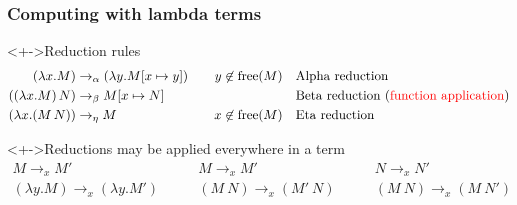\documentclass[pdftex,aspectratio=169]{beamer}
\begin{document}
\begin{frame}[fragile]
  \frametitle{Computing with lambda terms}
  \begin{block}<+->{Reduction rules}\VSPBLS
    \begin{alignat*}{2}
      (\lambda x.M) & \rightarrow_{\alpha} (\lambda y.M[x\mapsto y]) \quad 
      & y\not\in\operatorname{free}(M) & \quad\text{Alpha reduction}
      \\
      ((\lambda x.M)\,N) & \rightarrow_{\beta} M[x\mapsto N]
      && \quad\text{Beta reduction (\textcolor{red}{function application})}
      \\
      (\lambda x.(M\,N)) & \rightarrow_{\eta} M \quad
      & x\not\in\operatorname{free}(M) & \quad \text{Eta reduction}
    \end{alignat*}
  \end{block}
  \begin{block}<+->{Reductions may be applied everywhere in a term}
    \begin{displaymath}
    \begin{array}{c}
      M \rightarrow_x M'
      \\\hline
      (\lambda y.M) \rightarrow_x (\lambda y.M')
    \end{array}
    \qquad
    \begin{array}{c}
      M \rightarrow_x M'
      \\\hline
      (M~N) \rightarrow_x (M'~N)
    \end{array}
    \qquad
    \begin{array}{c}
      N \rightarrow_x N'
      \\\hline
      (M~N) \rightarrow_x (M~N')
    \end{array}
  \end{displaymath}
  \end{block}
\end{frame}
\end{document}
